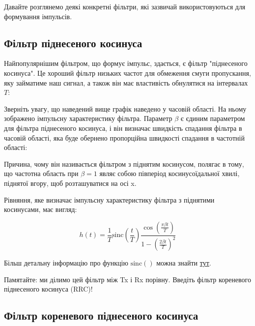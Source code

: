 Давайте розглянемо деякі конкретні фільтри, які зазвичай
використовуються для формування імпульсів.

\subsection{Фільтр піднесеного
косинуса}\label{ux444ux456ux43bux44cux442ux440-ux43fux456ux434ux43dux435ux441ux435ux43dux43eux433ux43e-ux43aux43eux441ux438ux43dux443ux441ux430}

Найпопулярнішим фільтром, що формує імпульс, здається, є фільтр
"піднесеного косинуса". Це хороший фільтр низьких частот для обмеження
смуги пропускання, яку займатиме наш сигнал, а також він має властивість
обнулятися на інтервалах \(T\):

\href{../_images/raised_cosine.svg}{}

Зверніть увагу, що наведений вище графік наведено у часовій області. На
ньому зображено імпульсну характеристику фільтра. Параметр \(\beta\) є
єдиним параметром для фільтра піднесеного косинуса, і він визначає
швидкість спадання фільтра в часовій області, яка буде обернено
пропорційна швидкості спадання в частотній області:

\href{../_images/raised_cosine_freq.svg}{}

Причина, чому він називається фільтром з піднятим косинусом, полягає в
тому, що частотна область при \(\beta = 1\) являє собою півперіод
косинусоїдальної хвилі, піднятої вгору, щоб розташуватися на осі x.

Рівняння, яке визначає імпульсну характеристику фільтра з піднятими
косинусами, має вигляд:

\[h(t) = \frac{1}{T} \mathrm{sinc}\left( \frac{t}{T} \right) \frac{\cos\left(\frac{\pi\beta t}{T}\right)}{1 - \left( \frac{2 \beta t}{T} \right)^2}\]

Більш детальну інформацію про функцію \(\mathrm{sinc}()\) можна знайти
\href{https://en.wikipedia.org/wiki/Sinc_function}{тут}.

Пам\textquotesingle ятайте: ми ділимо цей фільтр між Tx і Rx порівну.
Введіть фільтр кореневого піднесеного косинуса (RRC)!

\subsection{Фільтр кореневого піднесеного
косинуса}\label{ux444ux456ux43bux44cux442ux440-ux43aux43eux440ux435ux43dux435ux432ux43eux433ux43e-ux43fux456ux434ux43dux435ux441ux435ux43dux43eux433ux43e-ux43aux43eux441ux438ux43dux443ux441ux430}

